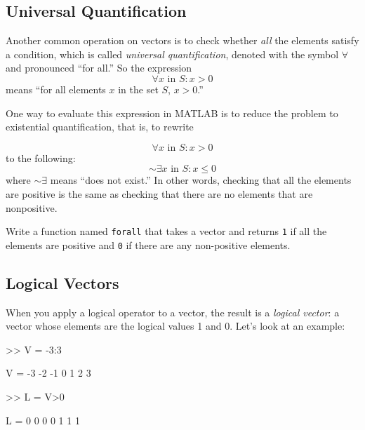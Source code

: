 \documentclass[../../book.tex]{subfiles}
\begin{document}
\subsection{Universal Quantification}


Another common operation on vectors is to check whether \emph{all} the elements satisfy a condition, which is called \emph{universal quantification}, denoted with
the symbol $\forall$ and pronounced ``for all.''  So the expression %
%
\[ \forall x \mbox{~in~} S: x>0 \]
%
means ``for all elements $x$ in the set $S$, $x>0$.''

One way to evaluate this expression in MATLAB is to reduce the problem to
existential quantification, that is, to rewrite

\begin{equation*}
\forall x \mbox{~in~} S: x>0
\end{equation*}
to the following:
\begin{equation*}
{\sim} \exists x \mbox{~in~} S: x \le 0
\end{equation*}
where ${\sim} \exists$ means ``does not exist.''
In other words, checking that all the  elements are positive is
the same as checking that there are no elements
that are nonpositive.

\begin{ex}
Write a function named \lstinline{forall} that
takes a vector and returns \lstinline{1} if all the elements are positive
and \lstinline{0} if there are any non-positive elements.

\end{ex}

\subsection{Logical Vectors}

When you apply a logical operator to a vector, the result is a
\emph{logical vector}: a vector whose elements are the logical
values 1 and 0. Let's look at an  example:


\begin{code}
>> V = -3:3

V = -3    -2    -1     0     1     2     3

>> L = V>0

L =  0     0     0     0     1     1     1
\end{code}
\end{document}
